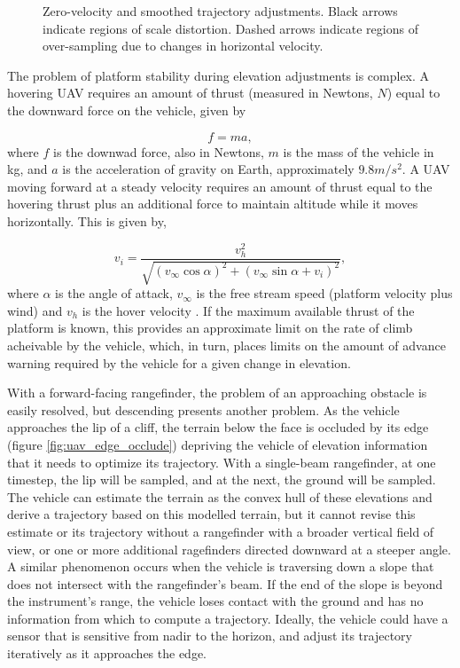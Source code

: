 \documentclass[10pt,a4paper]{report}
\begin{document}
\begin{figure}
\centering
\def\svgscale{0.5}

\caption{Zero-velocity and smoothed trajectory adjustments. Black arrows indicate regions of scale distortion. Dashed arrows indicate regions of over-sampling due to changes in horizontal velocity.}
\label{fig:uav_smooth_traj}
\end{figure}

The problem of platform stability during elevation adjustments is complex. A hovering UAV requires an amount of thrust (measured in Newtons, $N$) equal to the downward force on the vehicle, given by

\begin{equation}
f = ma,
\label{eq:hover_force}
\end{equation} where $f$ is the downwad force, also in Newtons, $m$ is the mass of the vehicle in kg, and $a$ is the acceleration of gravity on Earth, approximately $9.8m/s^2$. A UAV moving forward at a steady velocity requires an amount of thrust equal to the hovering thrust plus an additional force to maintain altitude while it moves horizontally. This is given by,

\begin{equation}
v_i = \dfrac{ v_h^2 } { \sqrt{ (v_\infty \cos \alpha)^2 + (v_\infty \sin \alpha + v_i)^2 } } ,
\label{eq:move_force}
\end{equation} where $\alpha$ is the angle of attack, $v_\infty$ is the free stream speed (platform velocity plus wind) and $v_h$ is the hover velocity \cite{Hoffmann2007}. If the maximum available thrust of the platform is known, this provides an approximate limit on the rate of climb acheivable by the vehicle, which, in turn, places limits on the amount of advance warning required by the vehicle for a given change in elevation.

With a forward-facing rangefinder, the problem of an approaching obstacle is easily resolved, but descending presents another problem. As the vehicle approaches the lip of a cliff, the terrain below the face is occluded by its edge (figure \ref{fig:uav_edge_occlude}) depriving the vehicle of elevation information that it needs to optimize its trajectory. With a single-beam rangefinder, at one timestep, the lip will be sampled, and at the next, the ground will be sampled. The vehicle can estimate the terrain as the convex hull of these elevations and derive a trajectory based on this modelled terrain, but it cannot revise this estimate or its trajectory without a rangefinder with a broader vertical field of view, or one or more additional ragefinders directed downward at a steeper angle. A similar phenomenon occurs when the vehicle is traversing down a slope that does not intersect with the rangefinder's beam. If the end of the slope is beyond the instrument's range, the vehicle loses contact with the ground and has no information from which to compute a trajectory.  Ideally, the vehicle could have a sensor that is sensitive from nadir to the horizon, and adjust its trajectory iteratively as it approaches the edge. 
\end{document}
